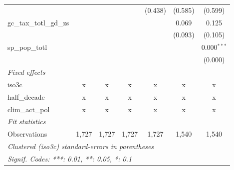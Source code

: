 \begin{tabular}{lcccccc}
                                                      &              &              &               & (0.438)       & (0.585)        & (0.599)\\   
   gc\_tax\_totl\_gd\_zs                              &              &              &               &               & 0.069          & 0.125\\   
                                                      &              &              &               &               & (0.093)        & (0.105)\\   
   sp\_pop\_totl                                      &              &              &               &               &                & 0.000$^{***}$\\   
                                                      &              &              &               &               &                & (0.000)\\   
   \emph{Fixed effects}\\
   iso3c                                              & x            & x            & x             & x             & x              & x\\  
   half\_decade                                       & x            & x            & x             & x             & x              & x\\  
   clim\_act\_pol                                     & x            & x            & x             & x             & x              & x\\  
   \midrule \emph{Fit statistics}\\
   Observations                                       & 1,727        & 1,727        & 1,727         & 1,727         & 1,540          & 1,540\\  
   \midrule
   \multicolumn{7}{l}{\emph{Clustered (iso3c) standard-errors in parentheses}}\\
   \multicolumn{7}{l}{\emph{Signif. Codes: ***: 0.01, **: 0.05, *: 0.1}}\\
\end{tabular}
\par\endgroup


